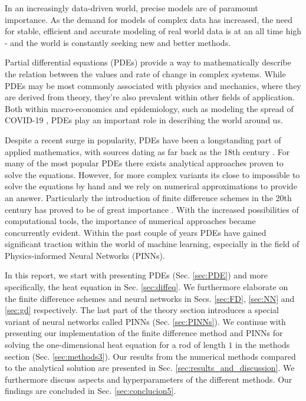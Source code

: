 In an increasingly data-driven world, precise models are of paramount importance.
As the demand for models of complex data has increased, the need for stable, efficient and accurate modeling of real world data is at an all time high - and the world is constantly seeking new and better methods.

Partial differential equations (PDEs) provide a way to mathematically describe the relation between the values and rate of change in complex systems.
While PDEs may be most commonly associated with physics and mechanics, where they are derived from theory, they're also prevalent within other fields of application.
Both within macro-economics \cite{ecoPDE} and epidemiology, such as modeling the spread of COVID-19 \cite{covidus}, PDEs play an important role in describing the world around us. 

Despite a recent surge in popularity, PDEs have been a longstanding part of applied mathematics, with sources dating as far back as the 18th century \cite{Cajori}. For many of the most popular PDEs there exists analytical approaches proven to solve the equations. However, for more complex variants its close to impossible to solve the equations by hand and we rely on numerical approximations to provide an answer. Particularly the introduction of finite difference schemes in the 20th century has proved to be of great importance \cite{sloan2012}. With the increased possibilities of computational tools, the importance of numerical approaches became concurrently evident. Within the past couple of years PDEs have gained significant traction within the world of machine learning, especially in the field of Physics-informed Neural Networks (PINNs).  

In this report, we start with presenting PDEs (Sec. \ref{sec:PDE}) and more specifically, the heat equation in Sec. \ref{sec:diffeq}.
We furthermore elaborate on the finite difference schemes and neural networks in Secs. \ref{sec:FD}, \ref{sec:NN} and \ref{sec:gd} respectively. 
The last part of the theory section introduces a special variant of neural networks called PINNs (Sec. \ref{sec:PINNs}).
We continue with presenting our implementation of the finite difference method and PINNs for solving the one-dimensional heat equation for a rod of length $1$ in the methods section (Sec. \ref{sec:methods3}).
Our results from the numerical methods compared to the analytical solution are presented in Sec. \ref{sec:results_and_discussion}.
We furthermore discuss aspects and hyperparameters of the different methods. 
Our findings are concluded in Sec. \ref{sec:conclucion5}.

